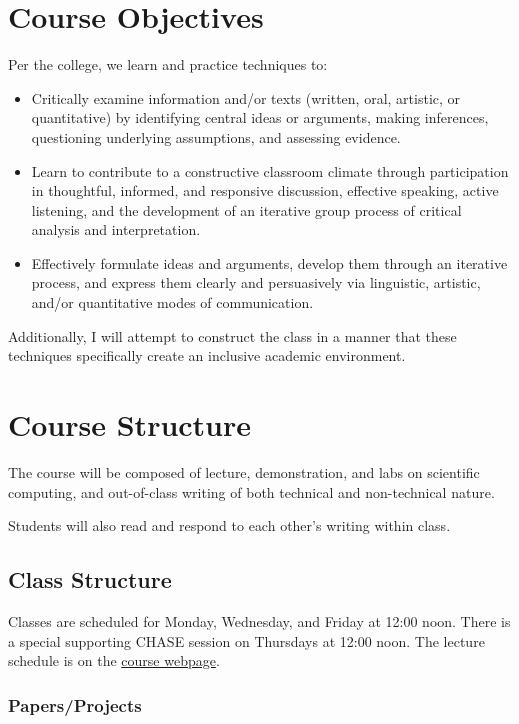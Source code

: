 \documentclass[11pt]{article}
\begin{document}
\section*{Course Objectives}
Per the college, we learn and practice techniques to:
\begin{itemize}
\item Critically examine information and/or texts (written, oral, artistic, or quantitative) by identifying central ideas or arguments, making inferences, questioning underlying assumptions, and assessing evidence.
\item Learn to contribute to a constructive classroom climate through participation in thoughtful, informed, and responsive discussion, effective speaking, active listening, and the development of an iterative group process of critical analysis and interpretation.
\item Effectively formulate ideas and arguments, develop them through an iterative process, and express them clearly and persuasively via linguistic, artistic, and/or quantitative modes of communication.
\end{itemize}
Additionally, I will attempt to construct the class in a manner that these techniques specifically create an inclusive academic environment.


\section*{Course Structure}

The course will be composed of lecture, demonstration, and labs on scientific computing, and out-of-class writing of both technical and non-technical nature.

Students will also read and respond to each other's writing within class.

\subsection*{Class Structure}

Classes are scheduled for Monday, Wednesday, and Friday at 12:00 noon. There is a special supporting CHASE session on Thursdays at 12:00 noon. The lecture schedule is on the \href{https://cd-public.github.io/scicom}{course webpage}.

\subsubsection*{Papers/Projects}
\end{document}
